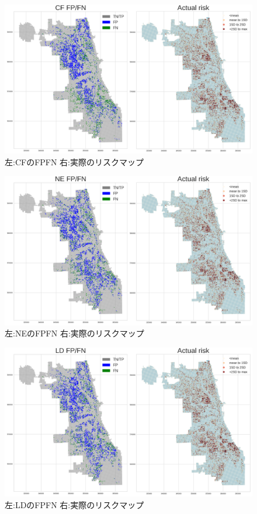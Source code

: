 \begin{figure}
  \centering %
  \includegraphics[scale=0.25]{./non-crime-timeseries-fig/CF_fnp.png}
  \caption{左:CFのFPFN 右:実際のリスクマップ}
  \label{fig:non-crime-timeseries-cf-fnp}
\end{figure}

\begin{figure}
  \centering %
  \includegraphics[scale=0.25]{./non-crime-timeseries-fig/NE_fnp.png}
  \caption{左:NEのFPFN 右:実際のリスクマップ}
  \label{fig:non-crime-timeseries-ne-fnp}
\end{figure}

\begin{figure}
  \centering %
  \includegraphics[scale=0.25]{./non-crime-timeseries-fig/LD_fnp.png}
  \caption{左:LDのFPFN 右:実際のリスクマップ}
  \label{fig:non-crime-timeseries-ld-fnp}
\end{figure}

